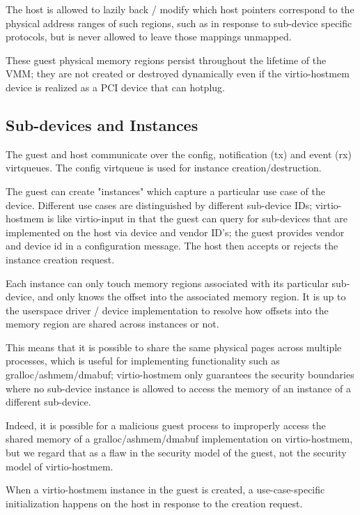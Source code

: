 The host is allowed to lazily back / modify which host pointers
correspond to the physical address ranges of such regions,
such as in response to sub-device specific protocols,
but is never allowed to leave those mappings unmapped.

These guest physical memory regions persist throughout the lifetime of the VMM;
they are not created or destroyed dynamically even if the virtio-hostmem device
is realized as a PCI device that can hotplug.

\subsection{Sub-devices and Instances}\label{sec:Device Types / Host Memory Device / Sub-devices and Instances}

The guest and host communicate
over the config, notification (tx) and event (rx) virtqueues.
The config virtqueue is used for instance creation/destruction.

The guest can create "instances" which capture
a particular use case of the device.
Different use cases are distinguished by different sub-device IDs;
virtio-hostmem is like virtio-input in that the guest can query
for sub-devices that are implemented on the host via device and vendor ID's;
the guest provides vendor and device id in a configuration message.
The host then accepts or rejects the instance creation request.

Each instance can only touch memory regions
associated with its particular sub-device,
and only knows the offset into the associated memory region.
It is up to the userspace driver / device implementation to
resolve how offsets into the memory region are shared across instances or not.

This means that it is possible to share the same physical pages across multiple processes,
which is useful for implementing functionality such as gralloc/ashmem/dmabuf;
virtio-hostmem only guarantees the security boundaries where
no sub-device instance is allowed to access the memory of an instance of
a different sub-device.

Indeed, it is possible for a malicious guest process to improperly access
the shared memory of a gralloc/ashmem/dmabuf implementation on virtio-hostmem,
but we regard that as a flaw in the security model of the guest,
not the security model of virtio-hostmem.

When a virtio-hostmem instance in the guest is created,
a use-case-specific initialization happens on the host
in response to the creation request.


